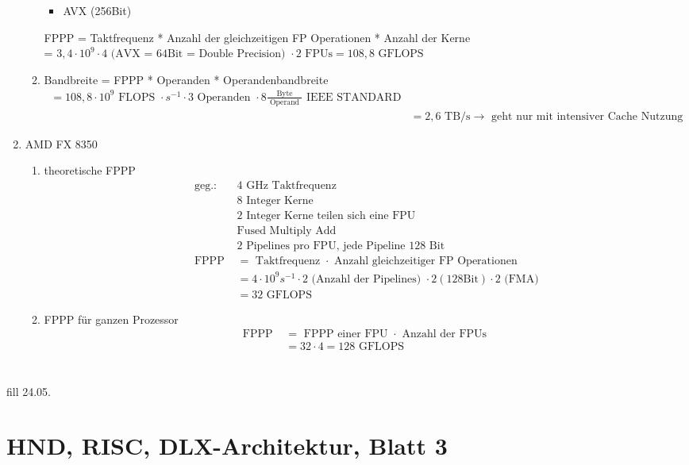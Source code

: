 \begin{enumerate}
\begin{enumerate}
\begin{itemize}
			\item AVX (256Bit)
		\end{itemize}
		FPPP = Taktfrequenz * Anzahl der gleichzeitigen FP Operationen * Anzahl der Kerne\\
		= \(3,4 \cdot 10^9 \cdot 4\text{ (AVX = 64Bit = Double Precision) } \cdot 2 \text{ FPUs} = 108,8 \text{ GFLOPS} \)
		\item Bandbreite = FPPP * Operanden * Operandenbandbreite
		\begin{align*}
			= 108,8 \cdot 10^9 \text{ FLOPS } \cdot s^{-1} \cdot 3 \text{ Operanden } \cdot 8 \frac{\text{ Byte }}{\text{ Operand }}\text{ IEEE STANDARD}\\
			&= 2,6 \text{ TB/s} \to \text{ geht nur mit intensiver Cache Nutzung}
		\end{align*}
	\end{enumerate}
	\item AMD FX 8350
	\begin{enumerate}
		\item theoretische FPPP
		\begin{align*}
		\text{geg.: } &4 \text{ GHz Taktfrequenz}\\
		& 8 \text{ Integer Kerne}\\
		& 2 \text{ Integer Kerne teilen sich eine FPU }\\
		& \text{Fused Multiply Add}\\
		& 2 \text{ Pipelines pro FPU, jede Pipeline 128 Bit }\\
		\text{FPPP } &=  \text{ Taktfrequenz } \cdot \text{  Anzahl gleichzeitiger FP Operationen }\\
		&= 4 \cdot 10^9 s^{-1} \cdot 2 \text{ (Anzahl der Pipelines) } \cdot 2 ( 128\text{Bit}) \cdot 2 \text{ (FMA)} \\
		&= 32 \text{ GFLOPS}
		\end{align*}
		\item FPPP für ganzen Prozessor
		\begin{align*}
		\text{FPPP } &= \text{ FPPP einer FPU } \cdot \text{ Anzahl der FPUs }\\
		&= 32 \cdot 4 = 128 \text{ GFLOPS}
		\end{align*}
	\end{enumerate}
\end{enumerate}

\section{}
fill 24.05.
\section{HND, RISC, DLX-Architektur, Blatt 3}
